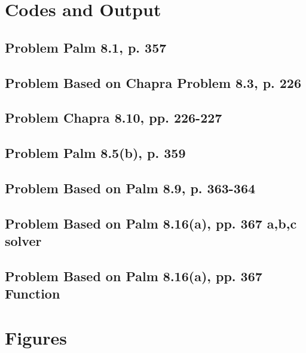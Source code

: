\documentclass{article}
\begin{document}
\pagebreak
\appendix
\section{Codes and Output}

\subsection{Problem Palm 8.1, p. 357}

\subsection{Problem Based on Chapra Problem 8.3, p. 226}


\subsection{Problem Chapra 8.10, pp. 226-227}


\subsection{Problem Palm 8.5(b), p. 359}

\subsection{Problem Based on Palm 8.9, p. 363-364}


\subsection{Problem Based on Palm 8.16(a), pp. 367 a,b,c solver}


\subsection{Problem Based on Palm 8.16(a), pp. 367 Function}


\pagebreak
\section{Figures}
\end{document}
